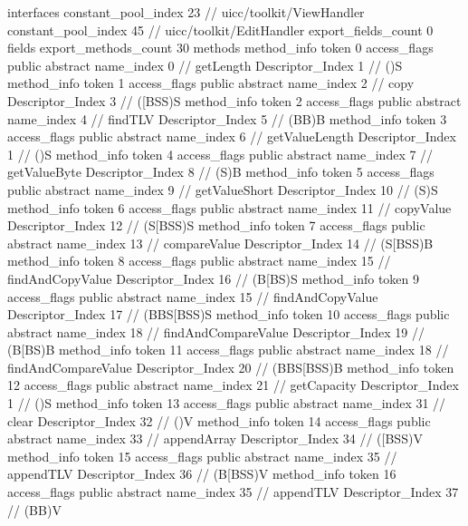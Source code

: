 {{{			interfaces {
				constant_pool_index	23		// uicc/toolkit/ViewHandler
				constant_pool_index	45		// uicc/toolkit/EditHandler
			}
			export_fields_count	0
			fields {
			}
			export_methods_count	30
			methods {
				method_info {
					token	0
					access_flags	public abstract
					name_index	0		// getLength
					Descriptor_Index	1		// ()S
				}
				method_info {
					token	1
					access_flags	public abstract
					name_index	2		// copy
					Descriptor_Index	3		// ([BSS)S
				}
				method_info {
					token	2
					access_flags	public abstract
					name_index	4		// findTLV
					Descriptor_Index	5		// (BB)B
				}
				method_info {
					token	3
					access_flags	public abstract
					name_index	6		// getValueLength
					Descriptor_Index	1		// ()S
				}
				method_info {
					token	4
					access_flags	public abstract
					name_index	7		// getValueByte
					Descriptor_Index	8		// (S)B
				}
				method_info {
					token	5
					access_flags	public abstract
					name_index	9		// getValueShort
					Descriptor_Index	10		// (S)S
				}
				method_info {
					token	6
					access_flags	public abstract
					name_index	11		// copyValue
					Descriptor_Index	12		// (S[BSS)S
				}
				method_info {
					token	7
					access_flags	public abstract
					name_index	13		// compareValue
					Descriptor_Index	14		// (S[BSS)B
				}
				method_info {
					token	8
					access_flags	public abstract
					name_index	15		// findAndCopyValue
					Descriptor_Index	16		// (B[BS)S
				}
				method_info {
					token	9
					access_flags	public abstract
					name_index	15		// findAndCopyValue
					Descriptor_Index	17		// (BBS[BSS)S
				}
				method_info {
					token	10
					access_flags	public abstract
					name_index	18		// findAndCompareValue
					Descriptor_Index	19		// (B[BS)B
				}
				method_info {
					token	11
					access_flags	public abstract
					name_index	18		// findAndCompareValue
					Descriptor_Index	20		// (BBS[BSS)B
				}
				method_info {
					token	12
					access_flags	public abstract
					name_index	21		// getCapacity
					Descriptor_Index	1		// ()S
				}
				method_info {
					token	13
					access_flags	public abstract
					name_index	31		// clear
					Descriptor_Index	32		// ()V
				}
				method_info {
					token	14
					access_flags	public abstract
					name_index	33		// appendArray
					Descriptor_Index	34		// ([BSS)V
				}
				method_info {
					token	15
					access_flags	public abstract
					name_index	35		// appendTLV
					Descriptor_Index	36		// (B[BSS)V
				}
				method_info {
					token	16
					access_flags	public abstract
					name_index	35		// appendTLV
					Descriptor_Index	37		// (BB)V
}}}}}
